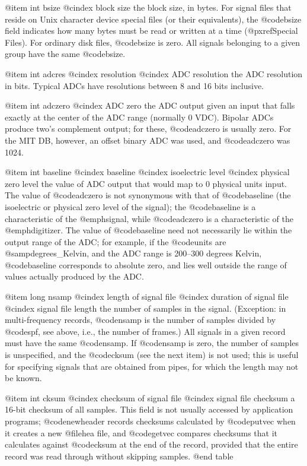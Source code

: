 {{{{{{{{{@item int bsize
@cindex block size
the block size, in bytes.  For signal files that reside on Unix character
device special files (or their equivalents), the @code{bsize} field
indicates how many bytes must be read or written at a time
(@pxref{Special Files}).  For ordinary disk files, @code{bsize} is zero.
All signals belonging to a given group have the same
@code{bsize}.

@item int adcres
@cindex resolution
@cindex ADC resolution
the ADC resolution in bits.  Typical ADCs have resolutions between 8 and 16
bits inclusive.

@item int adczero
@cindex ADC zero
the ADC output given an input that falls exactly at the center of the
ADC range (normally 0 VDC).  Bipolar ADCs produce two's complement
output; for these, @code{adczero} is usually zero.  For the MIT DB,
however, an offset binary ADC was used, and @code{adczero} was 1024.

@item int baseline
@cindex baseline
@cindex isoelectric level
@cindex physical zero level
the value of ADC output that would map to 0 physical units input.
The value of @code{adczero} is not synonymous with that of
@code{baseline} (the isoelectric or physical zero level of the signal);  the
@code{baseline} is a characteristic of the @emph{signal}, while
@code{adczero} is a characteristic of the @emph{digitizer}.  The value
of @code{baseline} need not necessarily lie within the output range of
the ADC;  for example, if the @code{units} are @samp{degrees_Kelvin},
and the ADC range is 200--300 degrees Kelvin, @code{baseline} corresponds to 
absolute zero, and lies well outside the range of values actually produced
by the ADC.

@item long nsamp
@cindex length of signal file
@cindex duration of signal file
@cindex signal file length
the number of samples in the signal.  (Exception: in multi-frequency records,
@code{nsamp} is the number of samples divided by @code{spf}, see above, i.e.,
the number of frames.)  All signals in a given record must have the same
@code{nsamp}.  If @code{nsamp} is zero, the number of samples is unspecified,
and the @code{cksum} (see the next item) is not used; this is useful for
specifying signals that are obtained from pipes, for which the length may not
be known.

@item int cksum
@cindex checksum of signal file
@cindex signal file checksum
a 16-bit checksum of all samples.  This field is not usually accessed by
application programs; @code{newheader} records checksums calculated by
@code{putvec} when it creates a new @file{hea} file, and
@code{getvec} compares checksums that it calculates against @code{cksum}
at the end of the record, provided that the entire record was read
through without skipping samples.
@end table

}}}}}}}}}
